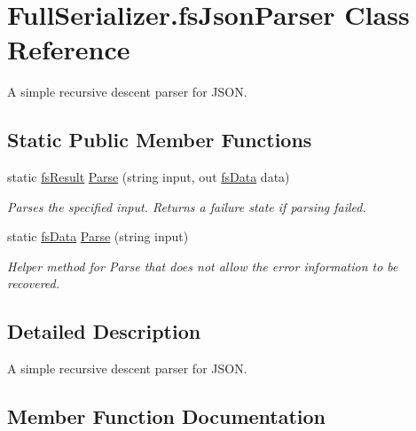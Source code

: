 \hypertarget{class_full_serializer_1_1fs_json_parser}{}\section{Full\+Serializer.\+fs\+Json\+Parser Class Reference}
\label{class_full_serializer_1_1fs_json_parser}


A simple recursive descent parser for J\+S\+ON.  


\subsection*{Static Public Member Functions}
\begin{DoxyCompactItemize}
\item 
static \hyperlink{struct_full_serializer_1_1fs_result}{fs\+Result} \hyperlink{class_full_serializer_1_1fs_json_parser_ae72b670aad2d571b7f5a04390a80685b}{Parse} (string input, out \hyperlink{class_full_serializer_1_1fs_data}{fs\+Data} data)
\begin{DoxyCompactList}\small\item\em Parses the specified input. Returns a failure state if parsing failed. \end{DoxyCompactList}\item 
static \hyperlink{class_full_serializer_1_1fs_data}{fs\+Data} \hyperlink{class_full_serializer_1_1fs_json_parser_a8becf3dc1005e717f5dc45e8044006a4}{Parse} (string input)
\begin{DoxyCompactList}\small\item\em Helper method for Parse that does not allow the error information to be recovered. \end{DoxyCompactList}\end{DoxyCompactItemize}


\subsection{Detailed Description}
A simple recursive descent parser for J\+S\+ON. 



\subsection{Member Function Documentation}
\mbox{\label{class_full_serializer_1_1fs_json_parser_ae72b670aad2d571b7f5a04390a80685b}} 
